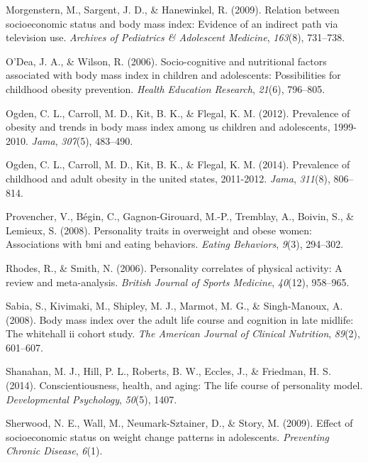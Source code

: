\documentclass[man]{apa6}
\begin{document}
\leavevmode\hypertarget{ref-morgenstern2009relation}{}%
Morgenstern, M., Sargent, J. D., \& Hanewinkel, R. (2009). Relation between socioeconomic status and body mass index: Evidence of an indirect path via television use. \emph{Archives of Pediatrics \& Adolescent Medicine}, \emph{163}(8), 731--738.

\leavevmode\hypertarget{ref-o2006socio}{}%
O'Dea, J. A., \& Wilson, R. (2006). Socio-cognitive and nutritional factors associated with body mass index in children and adolescents: Possibilities for childhood obesity prevention. \emph{Health Education Research}, \emph{21}(6), 796--805.

\leavevmode\hypertarget{ref-ogden2012prevalence}{}%
Ogden, C. L., Carroll, M. D., Kit, B. K., \& Flegal, K. M. (2012). Prevalence of obesity and trends in body mass index among us children and adolescents, 1999-2010. \emph{Jama}, \emph{307}(5), 483--490.

\leavevmode\hypertarget{ref-ogden2014prevalence}{}%
Ogden, C. L., Carroll, M. D., Kit, B. K., \& Flegal, K. M. (2014). Prevalence of childhood and adult obesity in the united states, 2011-2012. \emph{Jama}, \emph{311}(8), 806--814.

\leavevmode\hypertarget{ref-provencher2008personality}{}%
Provencher, V., Bégin, C., Gagnon-Girouard, M.-P., Tremblay, A., Boivin, S., \& Lemieux, S. (2008). Personality traits in overweight and obese women: Associations with bmi and eating behaviors. \emph{Eating Behaviors}, \emph{9}(3), 294--302.

\leavevmode\hypertarget{ref-rhodes2006personality}{}%
Rhodes, R., \& Smith, N. (2006). Personality correlates of physical activity: A review and meta-analysis. \emph{British Journal of Sports Medicine}, \emph{40}(12), 958--965.

\leavevmode\hypertarget{ref-sabia2008body}{}%
Sabia, S., Kivimaki, M., Shipley, M. J., Marmot, M. G., \& Singh-Manoux, A. (2008). Body mass index over the adult life course and cognition in late midlife: The whitehall ii cohort study. \emph{The American Journal of Clinical Nutrition}, \emph{89}(2), 601--607.

\leavevmode\hypertarget{ref-shanahan2014conscientiousness}{}%
Shanahan, M. J., Hill, P. L., Roberts, B. W., Eccles, J., \& Friedman, H. S. (2014). Conscientiousness, health, and aging: The life course of personality model. \emph{Developmental Psychology}, \emph{50}(5), 1407.

\leavevmode\hypertarget{ref-neumarkeffect}{}%
Sherwood, N. E., Wall, M., Neumark-Sztainer, D., \& Story, M. (2009). Effect of socioeconomic status on weight change patterns in adolescents. \emph{Preventing Chronic Disease}, \emph{6}(1).
\end{document}
